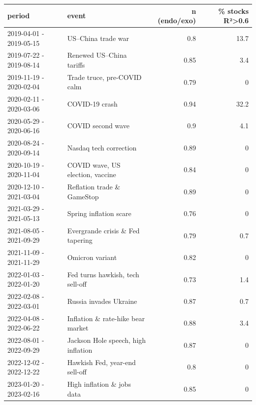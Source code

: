 \begin{tabular}{llrr}
\toprule
period & event & n (endo/exo) & \% stocks R²>0.6 \\
\midrule
2019-04-01 - 2019-05-15 & US–China trade war & 0.8 & 13.7 \\
2019-07-22 - 2019-08-14 & Renewed US–China tariffs & 0.85 & 3.4 \\
2019-11-19 - 2020-02-04 & Trade truce, pre-COVID calm & 0.79 & 0 \\
2020-02-11 - 2020-03-06 & COVID-19 crash & 0.94 & 32.2 \\
2020-05-29 - 2020-06-16 & COVID second wave & 0.9 & 4.1 \\
2020-08-24 - 2020-09-14 & Nasdaq tech correction & 0.89 & 0 \\
2020-10-19 - 2020-11-04 & COVID wave, US election, vaccine & 0.84 & 0 \\
2020-12-10 - 2021-03-04 & Reflation trade \& GameStop & 0.89 & 0 \\
2021-03-29 - 2021-05-13 & Spring inflation scare & 0.76 & 0 \\
2021-08-05 - 2021-09-29 & Evergrande crisis \& Fed tapering & 0.79 & 0.7 \\
2021-11-09 - 2021-11-29 & Omicron variant & 0.82 & 0 \\
2022-01-03 - 2022-01-20 & Fed turns hawkish, tech sell-off & 0.73 & 1.4 \\
2022-02-08 - 2022-03-01 & Russia invades Ukraine & 0.87 & 0.7 \\
2022-04-08 - 2022-06-22 & Inflation \& rate-hike bear market & 0.88 & 3.4 \\
2022-08-01 - 2022-09-29 & Jackson Hole speech, high inflation & 0.87 & 0 \\
2022-12-02 - 2022-12-22 & Hawkish Fed, year-end sell-off & 0.8 & 0 \\
2023-01-20 - 2023-02-16 & High inflation \& jobs data & 0.85 & 0 \\
\bottomrule
\end{tabular}
